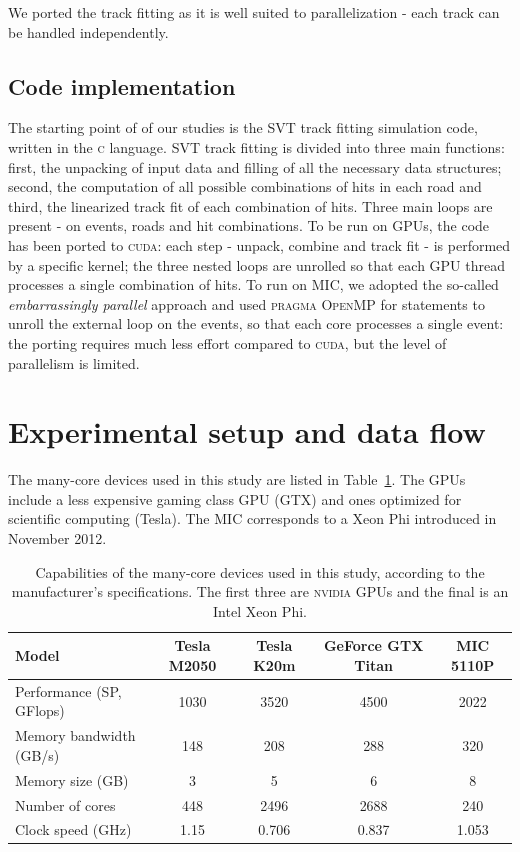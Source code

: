 \documentclass[a4]{jpconf}
\begin{document}
We ported the track fitting as it is well suited to parallelization -
each track can be handled independently.

\subsection{Code implementation}
The starting point of of our studies is the SVT track fitting
simulation code, written in the \textsc{c} language. SVT track fitting
is divided into three main functions: first, the unpacking of input
data and filling of all the necessary data structures; second, the
computation of all possible combinations of hits in each road and
third, the linearized track fit of each combination of hits. Three
main loops are present - on events, roads and hit combinations.  To be
run on GPUs, the code has been ported to \textsc{cuda}: each step -
unpack, combine and track fit - is performed by a specific kernel; the
three nested loops are unrolled so that each GPU thread processes a
single combination of hits.  To run on MIC, we adopted the so-called
\textit{embarrassingly parallel} approach and used \textsc{pragma
  OpenMP} for statements to unroll the external loop on the events, so
that each core processes a single event: the porting requires much
less effort compared to \textsc{cuda}, but the level of parallelism is
limited.

\section{Experimental setup and data flow}
The many-core devices used in this study are listed in
Table~\ref{tab_hwspecs}. The GPUs include a less expensive gaming
class GPU (GTX) and ones optimized for scientific computing
(Tesla). The MIC corresponds to a Xeon Phi introduced in November 2012.

\begin{table}[!t]
  \centering
  \begin{tabular}{|l|c|c|c|c|}
    \hline
    Model & Tesla M2050 & Tesla K20m & GeForce GTX  Titan & MIC 5110P \\
    \hline
    \hline
    Performance (SP, GFlops) & 1030 & 3520 & 4500 & 2022 \\
    Memory bandwidth  (GB/s) & 148 & 208 & 288  & 320\\   
    Memory size (GB) & 3 & 5 & 6 & 8 \\
    Number of cores & 448 & 2496 & 2688 & 240 \\
    Clock speed (GHz) & 1.15 & 0.706 & 0.837 & 1.053 \\
    \hline
  \end{tabular}
  \caption{Capabilities of the many-core devices used in this study,
    according to the manufacturer's specifications. The first three
    are \textsc{nvidia} GPUs and the final is an Intel Xeon Phi.}
  \label{tab_hwspecs}
\end{table}
\end{document}
